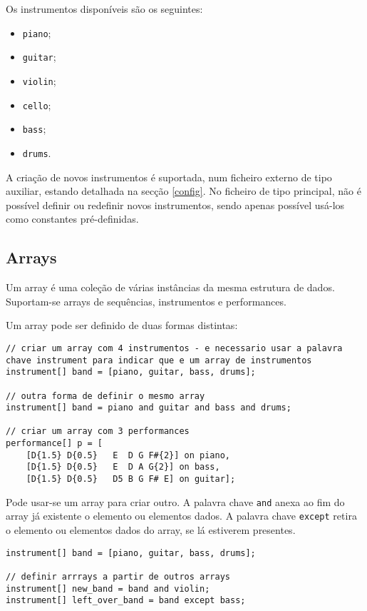 \documentclass{article}
\begin{document}
Os instrumentos disponíveis são os seguintes:
\begin{itemize}
    \item \texttt{piano};
    \item \texttt{guitar};
    \item \texttt{violin};
    \item \texttt{cello};
    \item \texttt{bass};
    \item \texttt{drums}.
\end{itemize}
A criação de novos instrumentos é suportada, num ficheiro externo de tipo auxiliar, estando detalhada na secção \ref{config}. No ficheiro de tipo principal, não é possível definir ou redefinir novos instrumentos, sendo apenas possível usá-los como constantes pré-definidas.

\subsection{Arrays}
Um array é uma coleção de várias instâncias da mesma estrutura de dados. Suportam-se arrays de sequências, instrumentos e performances.

Um array pode ser definido de duas formas distintas:
\begin{lstlisting} 
// criar um array com 4 instrumentos - e necessario usar a palavra chave instrument para indicar que e um array de instrumentos
instrument[] band = [piano, guitar, bass, drums];

// outra forma de definir o mesmo array
instrument[] band = piano and guitar and bass and drums;

// criar um array com 3 performances
performance[] p = [
    [D{1.5} D{0.5}   E  D G F#{2}] on piano, 
    [D{1.5} D{0.5}   E  D A G{2}] on bass,
    [D{1.5} D{0.5}   D5 B G F# E] on guitar];
\end{lstlisting} 

Pode usar-se um array para criar outro. A palavra chave \texttt{and} anexa ao fim do array já existente o elemento ou elementos dados.  A palavra chave \texttt{except} retira o elemento ou elementos dados do array, se lá estiverem presentes.

\begin{lstlisting} 
instrument[] band = [piano, guitar, bass, drums];

// definir arrrays a partir de outros arrays
instrument[] new_band = band and violin;
instrument[] left_over_band = band except bass;
\end{lstlisting} 
\end{document}

